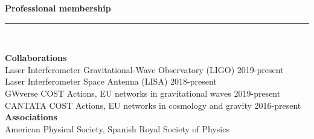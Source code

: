 \documentclass[11pt,a4paper]{article}
\newcommand{\secsizesmall}{0.05\linewidth}
\newcommand{\contsizelong}{0.95\linewidth}
\newcommand{\sectionsep}{12pt}
\begin{document}
\vspace{\sectionsep}
\textbf{Professional membership} \vspace{-8pt}\\ {\rule{\linewidth}{0.6pt}}\vspace{5pt}\\
\begin{minipage}[t]{\secsizesmall}
\begin{flushleft}
\end{flushleft}
\end{minipage}
\begin{minipage}[t]{\contsizelong}
\begin{flushleft}
\textbf{Collaborations} \\
{Laser Interferometer Gravitational-Wave Observatory (LIGO)} \hfill 2019-present \\%
{Laser Interferometer Space Antenna} (LISA) \hfill 2018-present \\%
{GWverse} COST Actions, EU networks in gravitational waves \hfill 2019-present\\
{CANTATA} COST Actions, EU networks in cosmology and gravity \hfill 2016-present \\%
\vspace{5pt}
\textbf{Associations} \\
American Physical Society, Spanish Royal Society of Physics
\end{flushleft}
\end{minipage}
\end{document}
